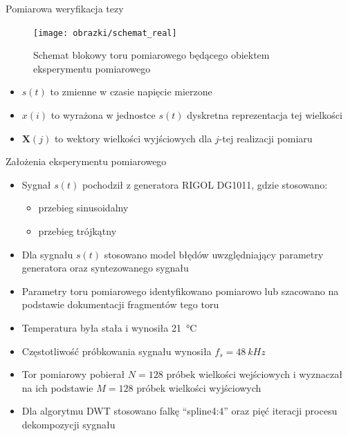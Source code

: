 \documentclass[12pt, polish, aspectratio = 169]{beamer}
\begin{document}
\begin{frame}{Pomiarowa weryfikacja tezy}
\begin{figure}
\texttt{[image: obrazki/schemat\_real]}
\caption{Schemat blokowy toru pomiarowego będącego obiektem eksperymentu pomiarowego}
\label{fig:chain_real}
\end{figure}
\begin{itemize}
\item $s(t)$ to zmienne w czasie napięcie mierzone
\item $x(i)$ to wyrażona w jednostce $s(t)$ dyskretna reprezentacja tej wielkości
\item $\mathbf{X}(j)$ to wektory wielkości wyjściowych dla $j$-tej realizacji pomiaru
\end{itemize}
\end{frame}

\begin{frame}{Założenia eksperymentu pomiarowego}
\begin{itemize}
\item Sygnał $s(t)$ pochodził z generatora RIGOL DG1011, gdzie stosowano:
	\begin{itemize}
	\item przebieg sinusoidalny
	\item przebieg trójkątny
	\end{itemize}
\item Dla sygnału $s(t)$ stosowano model błędów uwzględniający parametry generatora oraz syntezowanego sygnału
\item Parametry toru pomiarowego identyfikowano pomiarowo lub szacowano na podstawie dokumentacji fragmentów tego toru
\item Temperatura była stała i wynosiła \qty{21}{\degreeCelsius}
\item Częstotliwość próbkowania sygnału wynosiła $f_{s} = \qty{48}{kHz}$
\item Tor pomiarowy pobierał $N=128$ próbek wielkości wejściowych i wyznaczał na ich podstawie $M=128$ próbek wielkości wyjściowych
\item Dla algorytmu DWT stosowano falkę \enquote{spline4:4} oraz pięć iteracji procesu dekompozycji sygnału
\end{itemize}
\end{frame}
\end{document}
